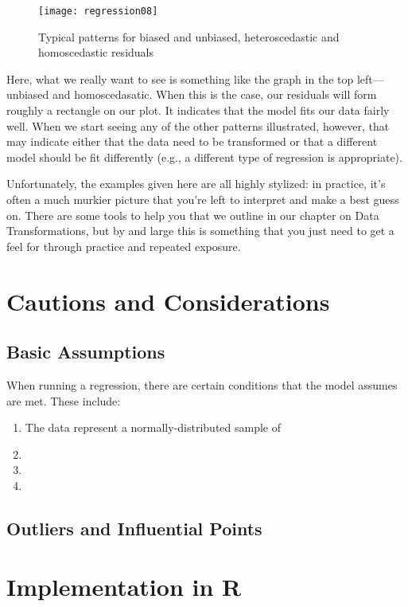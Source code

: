 \begin{figure}[h]
\texttt{[image: regression08]}
\label{fig:regression08}
\caption{Typical patterns for biased and unbiased, heteroscedastic and homoscedastic residuals}
\end{figure}

Here, what we really want to see is something like the graph in the top left---unbiased and homoscedasatic. When this is the case, our residuals will form roughly a rectangle on our plot. It indicates that the model fits our data fairly well. When we start seeing any of the other patterns illustrated, however, that may indicate either that the data need to be transformed or that a different model should be fit differently (e.g., a different type of regression is appropriate).

Unfortunately, the examples given here are all highly stylized: in practice, it's often a much murkier picture that you're left to interpret and make a best guess on. There are some tools to help you that we outline in our chapter on Data Transformations, but by and large this is something that you just need to get a feel for through practice and repeated exposure.

\section{Cautions and Considerations}

\subsection{Basic Assumptions}

When running a regression, there are certain conditions that the model assumes are met. These include:
\begin{enumerate}
	\item The data represent a normally-distributed sample of 
	\item 
	\item 
	\item 
\end{enumerate}

\subsection{Outliers and Influential Points}

\section{Implementation in R}

